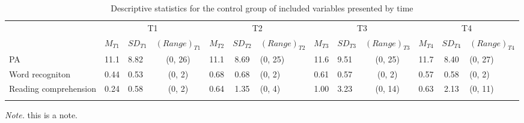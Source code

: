 \documentclass[
]{article}
\begin{document}
\begin{table}[tbp]

\begin{center}
\begin{threeparttable}

\caption{\label{tab:desc-read-control-table}Descriptive statistics for the control group of included variables presented by time}

\small{

\begin{tabular}{lclclclclclcl}
\toprule
 & \multicolumn{3}{c}{T1} & \multicolumn{3}{c}{T2} & \multicolumn{3}{c}{T3} & \multicolumn{3}{c}{T4} \\
\cmidrule(r){2-4} \cmidrule(r){5-7} \cmidrule(r){8-10} \cmidrule(r){11-13}
  & $M_{T1}$ & $SD_{T1}$ & $(Range)_{T1}$ & $M_{T2}$ & $SD_{T2}$ & $(Range)_{T2}$ & $M_{T3}$ & $SD_{T3}$ & $(Range)_{T3}$ & $M_{T4}$ & $SD_{T4}$ & $(Range)_{T4}$\\
\midrule
PA & 11.1 & 8.82 & (0, 26) & 11.1 & 8.69 & (0, 25) & 11.6 & 9.51 & (0, 25) & 11.7 & 8.40 & (0, 27)\\
Word recogniton & 0.44 & 0.53 & (0, 2) & 0.68 & 0.68 & (0, 2) & 0.61 & 0.57 & (0, 2) & 0.57 & 0.58 & (0, 2)\\
Reading comprehension & 0.24 & 0.58 & (0, 2) & 0.64 & 1.35 & (0, 4) & 1.00 & 3.23 & (0, 14) & 0.63 & 2.13 & (0, 11)\\
\bottomrule
\addlinespace
\end{tabular}

}

\begin{tablenotes}[para]
\normalsize{\textit{Note.}  this is a note.}
\end{tablenotes}

\end{threeparttable}
\end{center}

\end{table}
\end{document}
